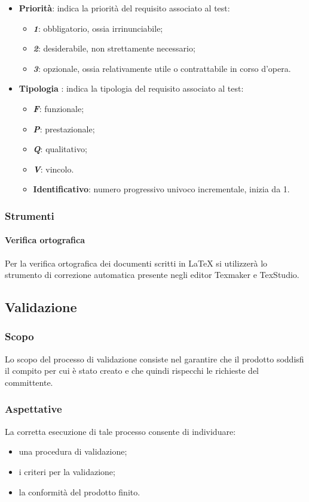 			\begin{itemize}
				\item \textbf{Priorità}: indica la priorità del requisito associato al test:
				\begin{itemize}
					\item \textbf{\textit{1}}: obbligatorio, ossia irrinunciabile;
					\item \textbf{\textit{2}}: desiderabile, non strettamente necessario;
					\item \textbf{\textit{3}}: opzionale, ossia relativamente utile o contrattabile in corso d'opera.
				\end{itemize}
				\item \textbf{Tipologia} : indica la tipologia del requisito associato al test:
				\begin{itemize}
					\item \textbf{\textit{F}}: funzionale;
					\item \textbf{\textit{P}}: prestazionale;
					\item \textbf{\textit{Q}}: qualitativo;
					\item \textbf{\textit{V}}: vincolo.
					\item \textbf{Identificativo}: numero progressivo univoco incrementale, inizia da 1.
				\end{itemize}
			\end{itemize}
			\subsubsection{Strumenti}
			\paragraph{Verifica ortografica}
			Per la verifica ortografica dei documenti scritti in \LaTeX{} si utilizzerà lo strumento di correzione automatica presente negli editor Texmaker e TexStudio.

	\subsection{Validazione}
		\subsubsection{Scopo}
			Lo scopo del processo di validazione consiste nel garantire che il prodotto soddisfi il compito per cui è stato creato e che quindi rispecchi le richieste del committente.
		\subsubsection{Aspettative}
			La corretta esecuzione di tale processo consente di individuare:
			\begin{itemize}
				\item una procedura di validazione;
				\item i criteri per la validazione;
				\item la conformità del prodotto finito.
			\end{itemize}
